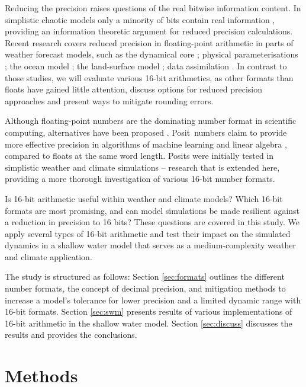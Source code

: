Reducing the precision raises questions of the real bitwise information content.
In simplistic chaotic models only a minority of bits contain real information
\citep{Jeffress2017}, providing an information theoretic argument for reduced
precision calculations. Recent research covers reduced precision in
floating-point arithmetic in parts of weather forecast models,
such as the dynamical core \citep{Duben2014,Thornes2017,Chantry2019,Hatfield2020};
physical parameterisations \citep{Saffin2020};
the ocean model \citep{TintoPrims2019}; the land-surface model \citep{Dawson2018};
data assimilation \citep{Hatfield2017,Hatfield2018}. In contrast to those studies,
we will evaluate various 16-bit arithmetics, as other formats than floats have
gained little attention, discuss options for reduced precision approaches and present
ways to mitigate rounding errors.

Although floating-point numbers are the dominating number format in scientific
computing, alternatives have been proposed \citep{Gustafson2017a,Johnson2020}.
Posit\texttrademark ~numbers claim to provide more effective precision in algorithms
of machine learning and linear algebra \citep{Gustafson2017,Langroudi2019}, compared
to floats at the same word length. Posits were initially tested in simplistic
weather and climate simulations \citep{Klower2019a} -- research that is extended
here, providing a more thorough investigation of various 16-bit number formats.

Is 16-bit arithmetic useful within weather and climate models? Which 16-bit
formats are most promising, and can model simulations be made resilient
against a reduction in precision to 16 bits? These questions are covered in
this study. We apply several types of 16-bit arithmetic and test their impact
on the simulated dynamics in a shallow water model that serves as a medium-complexity
weather and climate application.

The study is structured as follows: Section \ref{sec:formats} outlines the
different number formats, the concept of decimal precision, and mitigation
methods to increase a model's tolerance for lower precision and a limited dynamic
range with 16-bit formats. Section \ref{sec:swm} presents results
of various implementations of 16-bit arithmetic in the shallow water model.
Section \ref{sec:discuss} discusses the results and provides the conclusions.

\section{Methods}
